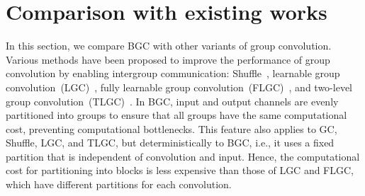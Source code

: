 \documentclass[preprint,12pt,authoryear]{elsarticle}
\numberwithin{equation}{section}
\theoremstyle{remark}
\begin{document}
\section{Comparison with existing works}
\label{Sec:Comparison}
\begin{table}
\caption{Overview of various variants of group convolution~(GC),
where $n$ and $m$ denote the numbers of input and output channels, respectively, $N$ denotes the number of groups, and $K$ represents the number of parameters of the single-channel convolutional layer.}
\label{tab:existing}
\end{table}

In this section, we compare BGC with other variants of group convolution.
Various methods have been proposed to improve the performance of group convolution by enabling intergroup communication: Shuffle~\citep{zhang2018shufflenet}, learnable group convolution~(LGC)~\citep{Huang_2018_CVPR}, fully learnable group convolution~(FLGC)~\citep{Wang_2019_CVPR}, and two-level group convolution~(TLGC)~\citep{lee2022two}.
In BGC, input and output channels are evenly partitioned into groups to ensure that all groups have the same computational cost, preventing computational bottlenecks.
This feature also applies to GC, Shuffle, LGC, and TLGC, but deterministically to BGC, i.e., it uses a fixed partition that is independent of convolution and input.
Hence, the computational cost for partitioning into blocks is less expensive than those of LGC and FLGC, which have different partitions for each convolution.
\end{document}
